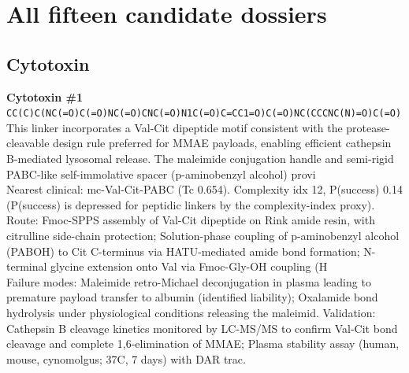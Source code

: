 \documentclass[10pt]{article}
\begin{document}
\section{All fifteen candidate dossiers}
\subsection{Cytotoxin}
\noindent\textbf{Cytotoxin \#1} \\ \texttt{CC(C)C(NC(=O)C(=O)NC(=O)CNC(=O)N1C(=O)C=CC1=O)C(=O)NC(CCCNC(N)=O)C(=O)} \\ This linker incorporates a Val-Cit dipeptide motif consistent with the protease-cleavable design rule preferred for MMAE payloads, enabling efficient cathepsin B-mediated lysosomal release. The maleimide conjugation handle and semi-rigid PABC-like self-immolative spacer (p-aminobenzyl alcohol) provi \\ Nearest clinical: mc-Val-Cit-PABC (Tc 0.654). Complexity idx 12, P(success) 0.14 (P(success) is depressed for peptidic linkers by the complexity-index proxy). \\ Route: Fmoc-SPPS assembly of Val-Cit dipeptide on Rink amide resin, with citrulline side-chain protection; Solution-phase coupling of p-aminobenzyl alcohol (PABOH) to Cit C-terminus via HATU-mediated amide bond formation; N-terminal glycine extension onto Val via Fmoc-Gly-OH coupling (H \\ Failure modes: Maleimide retro-Michael deconjugation in plasma leading to premature payload transfer to albumin (identified liability); Oxalamide bond hydrolysis under physiological conditions releasing the maleimid. Validation: Cathepsin B cleavage kinetics monitored by LC-MS/MS to confirm Val-Cit bond cleavage and complete 1,6-elimination of MMAE; Plasma stability assay (human, mouse, cynomolgus; 37\textdegree{}C, 7 days) with DAR trac. \\[0.4em]
\end{document}
